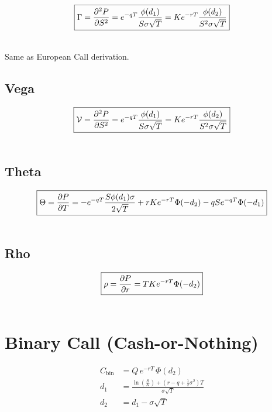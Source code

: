 \documentclass[12pt,a4paper]{article}
\begin{document}
\[
  \boxed{\Gamma = \frac{\partial^2 P}{\partial S^2} = e^{-qT}\frac{\phi(d_1)}{S\sigma\sqrt{T}} = Ke^{-rT} \frac{\phi(d_2)}{S^2\sigma\sqrt{T}}}\\
\]

\[
  \begin{aligned}
  \end{aligned}
\]

Same as European Call derivation.

\subsection{Vega}

\[
  \boxed{\mathcal{V} = \frac{\partial^2 P}{\partial S^2} = e^{-qT}\frac{\phi(d_1)}{S\sigma\sqrt{T}} = Ke^{-rT} \frac{\phi(d_2)}{S^2\sigma\sqrt{T}}}\\
\]

\[
  \begin{aligned}
  \end{aligned}
\]

\subsection{Theta}

\[
  \boxed{\Theta = \frac{\partial P}{\partial T} = -e^{-qT}\frac{S\phi(d_1)\sigma}{2\sqrt{T}} + rKe^{-rT}\Phi(-d_2) - qSe^{-qT}\Phi(-d_1)}\\
\]


\[
  \begin{aligned}
  \end{aligned}
\]

\subsection{Rho}

\[
  \boxed{\rho = \frac{\partial P}{\partial r} = TKe^{-rT}\Phi(-d_2)}\\
\]

\[
  \begin{aligned}
  \end{aligned}
\]

\newpage

\section{Binary Call (Cash-or-Nothing)}

\[
  \begin{aligned}
    C_{\mathrm{bin}} & = Q \, e^{-rT} \,\Phi(d_2) \\
    d_1 & = \frac{\ln\!\left(\tfrac{S}{K}\right) + (r - q + \tfrac{1}{2}\sigma^2)T}{\sigma \sqrt{T}} \\
    d_2 & = d_1 - \sigma \sqrt{T}
  \end{aligned}
\]
\end{document}
